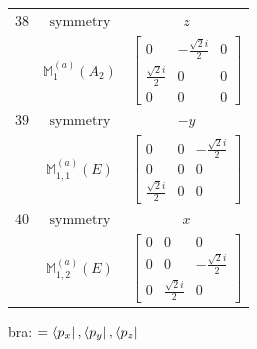 \documentclass[fleqn,8pt,landscape]{jsarticle}
\begin{document}
\begin{longtable}{ccc}
$ 38 $ & $ \text{symmetry} $ & $ z $ \\
$  $ & $ \mathbb{M}_{1}^{(a)}(A_{2}) $ & $ \begin{bmatrix} 0 & - \frac{\sqrt{2} i}{2} & 0 \\ \frac{\sqrt{2} i}{2} & 0 & 0 \\ 0 & 0 & 0 \end{bmatrix} $ \\ \hline
$ 39 $ & $ \text{symmetry} $ & $ - y $ \\
$  $ & $ \mathbb{M}_{1,1}^{(a)}(E) $ & $ \begin{bmatrix} 0 & 0 & - \frac{\sqrt{2} i}{2} \\ 0 & 0 & 0 \\ \frac{\sqrt{2} i}{2} & 0 & 0 \end{bmatrix} $ \\ \hline
$ 40 $ & $ \text{symmetry} $ & $ x $ \\
$  $ & $ \mathbb{M}_{1,2}^{(a)}(E) $ & $ \begin{bmatrix} 0 & 0 & 0 \\ 0 & 0 & - \frac{\sqrt{2} i}{2} \\ 0 & \frac{\sqrt{2} i}{2} & 0 \end{bmatrix} $ \\ \hline
\end{longtable}
bra: $=\bra{p_{x}}, \bra{p_{y}}, \bra{p_{z}}$
\end{document}
